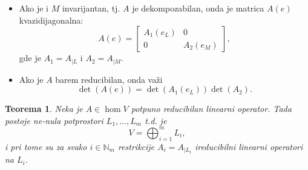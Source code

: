 \documentclass[a4paper,12pt,twoside]{report}
\newtheorem{theorem}{Teorema}[section]
\numberwithin{algorithm}{section}
\newcommand{\intuicija}{\noindent\underline{\textit{Intuicija:}}\ }
\begin{document}
\begin{itemize}
    \intuicija Kako je $L$ invarijantni potprostor i $\dim L = k$, matrica $A_1(e_L)$ će biti 
    dimenzija $k \times k$ (jer slika $L$ u $L$). Ovo znači da će se ispod $A_1(e_L)$ nalaziti nula-matrica dimenzija $(n-k) \times k$
    (jer $A_1(e_L)$ ne slika ništa van $L$). Kako nije dato da je $M$ invarijantni potprostor, druga kolona u opštem slučaju neće
    imati nula-matricu. Dakle, matrica $A_{12}$ slika $M$ u $L$ (jer u $e$ prvo ide $e_L$ pa $e_M$), pa mora biti dimenzija 
    $k \times (n-k)$. Preostali blok $A_2$ je dimenzija $(n-k)\times (n-k)$ i on opisuje kako se vektori iz $M$ projektuju 
    nazad u $M$. On nije restrikcija u $M$ (jer nije invarijantan), već samo jedan blok u matrici. Dijagram:
    \[
        \begin{array}{cc}
         & \begin{array}{cc}
           \text{kolone } L\;\;\;\;\;\;\;\;\;\;\;\;\;\;\; & \text{kolone } M 
         \end{array} \\[4pt]
        \begin{array}{c}
         \text{vrste } L \\
         \text{vrste } M 
        \end{array} &
        \left[\begin{array}{c|c}
        A_1[k \times k] & A_{12}[k \times (n-k)] \\ \hline
        0 [(n-k) \times k] & A_2[(n-k) \times (n-k)]
        \end{array}\right]
        \end{array}
    \]
    \item Ako je i $M$ invarijantan, tj. $A$ je dekompozabilan, onda je matrica $A(e)$ kvazidijagonalna:
    \[ A(e) = \begin{bmatrix}
        A_1(e_L) & 0 \\
        0 & A_2(e_M)
    \end{bmatrix}, \]
    gde je $A_1 = A_{|L}$ i $A_2 = A_{|M}$.
    \item Ako je $A$ barem reducibilan, onda važi
    \[ \det (A(e)) = \det(A_1(e_L)) \det (A_2). \]
\end{itemize}

\begin{theorem}
    \label{rlonkdp1}
    Neka je $A \in \hom V$ potpuno reducibilan linearni operator. Tada postoje ne-nula potprostori $L_1, 
    \dots, L_m$ t.d. je \[ V = \bigoplus_{i=1}^m L_i, \] i pri tome su za svako $i \in \mathbb{N}_m$ restrikcije
    $A_i = A_{|L_i}$ ireducibilni linearni operatori na $L_i$.
\end{theorem}
\end{document}
